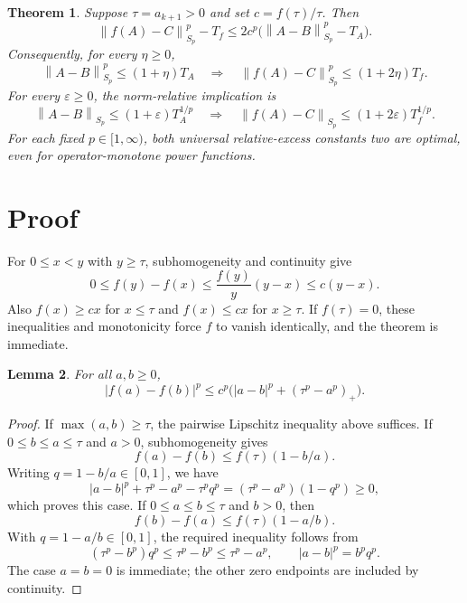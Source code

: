 \documentclass[11pt]{article}
\newtheorem{theorem}{Theorem}[section]
\newtheorem{lemma}[theorem]{Lemma}
\theoremstyle{definition}
\newcommand{\norm}[1]{\left\lVert#1\right\rVert}
\newcommand{\eps}{\varepsilon}
\begin{document}
\begin{theorem}\label{thm:commuting}
Suppose $\tau=a_{k+1}>0$ and set $c=f(\tau)/\tau$. Then
\[
 \norm{f(A)-C}_{S_p}^p-T_f
 \le 2c^p\bigl(\norm{A-B}_{S_p}^p-T_A\bigr).
\]
Consequently, for every $\eta\ge0$,
\[
 \norm{A-B}_{S_p}^p\le(1+\eta)T_A
 \quad\Longrightarrow\quad
 \norm{f(A)-C}_{S_p}^p\le(1+2\eta)T_f.
\]
For every $\eps\ge0$, the norm-relative implication is
\[
 \norm{A-B}_{S_p}\le(1+\eps)T_A^{1/p}
 \quad\Longrightarrow\quad
 \norm{f(A)-C}_{S_p}\le(1+2\eps)T_f^{1/p}.
\]
For each fixed $p\in[1,\infty)$, both universal relative-excess constants two are optimal, even for operator-monotone power functions.
\end{theorem}

\section{Proof}
For $0\le x<y$ with $y\ge\tau$, subhomogeneity and continuity give
\[
 0\le f(y)-f(x)\le\frac{f(y)}{y}(y-x)\le c(y-x).
\]
Also $f(x)\ge cx$ for $x\le\tau$ and $f(x)\le cx$ for $x\ge\tau$. If $f(\tau)=0$, these inequalities and monotonicity force $f$ to vanish identically, and the theorem is immediate.

\begin{lemma}\label{lem:scalar}
For all $a,b\ge0$,
\[
 |f(a)-f(b)|^p\le c^p\bigl(|a-b|^p+(\tau^p-a^p)_+\bigr).
\]
\end{lemma}
\begin{proof}
If $\max(a,b)\ge\tau$, the pairwise Lipschitz inequality above suffices.
If $0\le b\le a\le\tau$ and $a>0$, subhomogeneity gives
\[
 f(a)-f(b)\le f(\tau)(1-b/a).
\]
Writing $q=1-b/a\in[0,1]$, we have
\[
 |a-b|^p+\tau^p-a^p-\tau^pq^p
 =(\tau^p-a^p)(1-q^p)\ge0,
\]
which proves this case.
If $0\le a\le b\le\tau$ and $b>0$, then
\[
 f(b)-f(a)\le f(\tau)(1-a/b).
\]
With $q=1-a/b\in[0,1]$, the required inequality follows from
\[
 (\tau^p-b^p)q^p\le\tau^p-b^p\le\tau^p-a^p,
 \qquad |a-b|^p=b^pq^p.
\]
The case $a=b=0$ is immediate; the other zero endpoints are included by continuity.
\end{proof}
\end{document}
